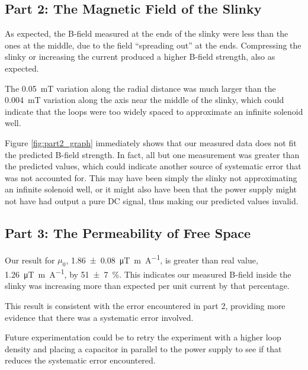 \documentclass[a4paper]{scrartcl}
\begin{document}
\subsection{Part 2: The Magnetic Field of the Slinky}
As expected, the B-field measured at the ends of the slinky were less than the ones at the middle, due to the field ``spreading out'' at the ends. Compressing the slinky or increasing the current produced a higher B-field strength, also as expected.

The \SI{0.05}{\milli\tesla} variation along the radial distance was much larger than the \SI{0.004}{\milli\tesla} variation along the axis near the middle of the slinky, which could indicate that the loops were too widely spaced to approximate an infinite solenoid well.

Figure \ref{fig:part2_graph} immediately shows that our measured data does not fit the predicted B-field strength. In fact, all but one measurement was greater than the predicted values, which could indicate another source of systematic error that was not accounted for. This may have been simply the slinky not approximating an infinite solenoid well, or it might also have been that the power supply might not have had output a pure DC signal, thus making our predicted values invalid.

\subsection{Part 3: The Permeability of Free Space}
Our result for \(\mu_0\), \SI{1.86 \pm 0.08}{\micro\tesla\metre\per\ampere}, is greater than real value, \SI{1.26}{\micro\tesla\metre\per\ampere}, by \SI{51 \pm 7}{\percent}. This indicates our measured B-field inside the slinky was increasing more than expected per unit current by that percentage.

This result is consistent with the error encountered in part 2, providing more evidence that there was a systematic error involved.

Future experimentation could be to retry the experiment with a higher loop density and placing a capacitor in parallel to the power supply to see if that reduces the systematic error encountered.
\end{document}
